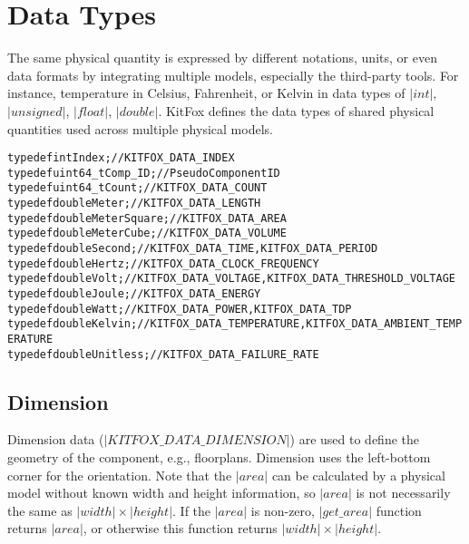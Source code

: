 \section{Data Types} \label{sec:data_type}
\noindent
The same physical quantity is expressed by different notations, units, or even data formats by integrating multiple models, especially the third-party tools.
For instance, temperature in Celsius, Fahrenheit, or Kelvin in data types of $|int|$, $|unsigned|$, $|float|$, $|double|$.
KitFox defines the data types of shared physical quantities used across multiple physical models.

{
\fontsize{10pt}{11pt}\selectfont
\begin{alltt}
typedef int Index;            // KITFOX_DATA_INDEX
typedef uint64_t Comp_ID;     // Pseudo Component ID
typedef uint64_t Count;       // KITFOX_DATA_COUNT
typedef double Meter;         // KITFOX_DATA_LENGTH
typedef double MeterSquare;   // KITFOX_DATA_AREA
typedef double MeterCube;     // KITFOX_DATA_VOLUME
typedef double Second;        // KITFOX_DATA_TIME, KITFOX_DATA_PERIOD
typedef double Hertz;         // KITFOX_DATA_CLOCK_FREQUENCY
typedef double Volt;          // KITFOX_DATA_VOLTAGE, KITFOX_DATA_THRESHOLD_VOLTAGE
typedef double Joule;         // KITFOX_DATA_ENERGY
typedef double Watt;          // KITFOX_DATA_POWER, KITFOX_DATA_TDP
typedef double Kelvin;        // KITFOX_DATA_TEMPERATURE, KITFOX_DATA_AMBIENT_TEMPERATURE
typedef double Unitless;      // KITFOX_DATA_FAILURE_RATE
\end{alltt}
}

\subsection{Dimension} \label{subsec:dimension}
\noindent
Dimension data ($|KITFOX\_DATA\_DIMENSION|$) are used to define the geometry of the component, e.g., floorplans. 
Dimension uses the left-bottom corner for the orientation.
Note that the $|area|$ can be calculated by a physical model without known width and height information, so $|area|$ is not necessarily the same as $|width|\times|height|$.
If the $|area|$ is non-zero, $|get\_area|$ function returns $|area|$, or otherwise this function returns $|width|\times|height|$.

